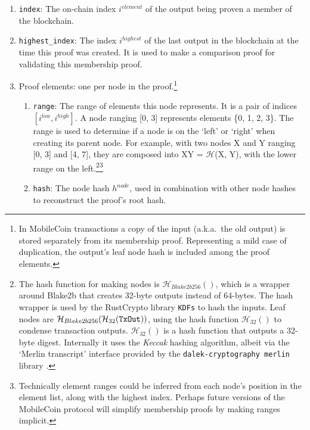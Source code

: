 \begin{enumerate}
    \item {\tt index}: The on-chain index $i^{element}$ of the output being proven a member of the blockchain.
    \item {\tt highest\_index}: The index $i^{highest}$ of the last output in the blockchain at the time this proof was created. It is used to make a comparison proof for validating this membership proof.
    \item Proof elements: one per node in the proof.\footnote{In MobileCoin transactions a copy of the input (a.k.a.\ the old output) is stored separately from its membership proof. Representing a mild case of duplication, the output's leaf node hash is included among the proof elements.}
    \begin{enumerate}
        \item {\tt range}: The range of elements this node represents. It is a pair of indices $[i^{low}, i^{high}]$. A node ranging [0, 3] represents elements \{0, 1, 2, 3\}. The range is used to determine if a node is on the `left' or `right' when creating its parent node. For example, with two nodes X and Y ranging [0, 3] and [4, 7], they are composed into XY = $\mathcal{H}$(X, Y), with the lower range on the left.\footnote{The hash function for making nodes is $\mathcal{H}_{Blake2b256}()$, which is a wrapper around Blake2b that creates 32-byte outputs instead of 64-bytes. The hash wrapper is used by the RustCrypto library {\tt KDFs} \cite{kdfs-rust-lib, hkdf-rfc5869} to hash the inputs. Leaf nodes are $\mathcal{H}_{Blake2b256}(\mathcal{H}_{32}(\textrm{\tt TxOut}))$, using the hash function $\mathcal{H}_{32}()$ to condense transaction outputs. $\mathcal{H}_{32}()$ is a hash function that outputs a 32-byte digest. Internally it uses the {\em Keccak} hashing algorithm, albeit via the `Merlin transcript' interface \cite{merlin-transcripts} provided by the {\tt dalek-cryptography merlin} library \cite{dalek-merlin-lib}.}\footnote{Technically element ranges could be inferred from each node's position in the element list, along with the highest index. Perhaps future versions of the MobileCoin protocol will simplify membership proofs by making ranges implicit.}
        \item {\tt hash}: The node hash $h^{node}$, used in combination with other node hashes to reconstruct the proof's root hash.
    \end{enumerate}
\end{enumerate}

